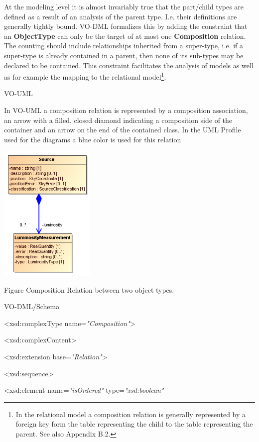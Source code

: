 \documentclass[10pt,a4paper]{ivoa}
\begin{document}
At the modeling level it is almost invariably true that the part/child
types are defined as a result of an analysis of the parent type. I.e.
their definitions are generally tightly bound. VO-DML formalizes this by
adding the constraint that an \textbf{ObjectType} can only be the target
of at most one \textbf{Composition} relation. The counting should
include relationships inherited from a super-type, i.e. if a super-type
is already contained in a parent, then none of its sub-types may be
declared to be contained. This constraint facilitates the analysis of
models as well as for example the mapping to the relational
model\footnote{In the relational model a composition relation is
  generally represented by a foreign key form the table representing the
  child to the table representing the parent. See also Appendix B.2.}.

VO-UML

In VO-UML a composition relation is represented by a composition
association, an arrow with a filled, closed diamond indicating a
composition side of the container and an arrow on the end of the
contained class. In the UML Profile used for the diagrams a blue color
is used for this relation

\includegraphics[width=1.8in,height=2.6in]{./media/image19.png}

Figure Composition Relation between two object types.

VO-DML/Schema

\textless xsd:complexType name=\emph{"Composition"}\textgreater{}

\textless xsd:complexContent\textgreater{}

\textless xsd:extension base=\emph{"Relation"}\textgreater{}

\textless xsd:sequence\textgreater{}

\textless xsd:element name=\emph{"isOrdered"} type=\emph{"xsd:boolean"}
\end{document}
